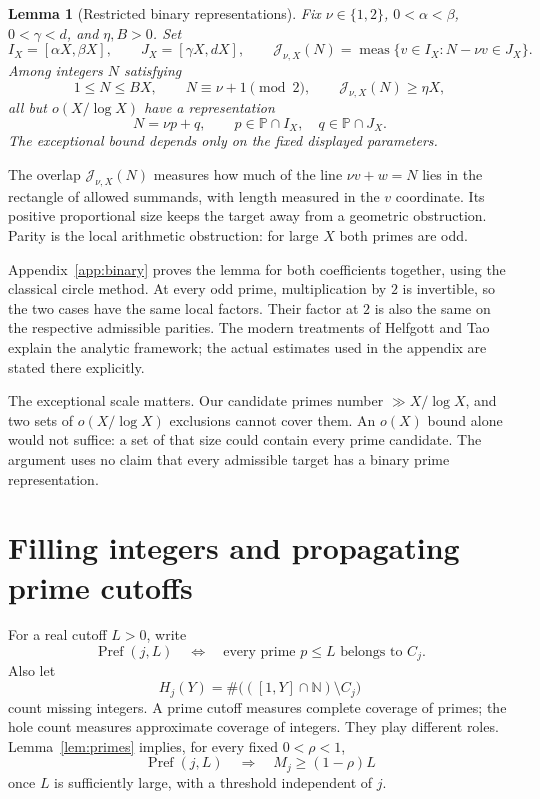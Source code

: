 \documentclass[11pt,letterpaper]{article}
\numberwithin{equation}{section}
\newtheorem{lemma}[theorem]{Lemma}
\theoremstyle{definition}
\theoremstyle{remark}
\DeclareMathOperator{\meas}{meas}
\DeclareMathOperator{\Pref}{Pref}
\newcommand{\N}{\mathbb N}
\newcommand{\Pp}{\mathbb P}
\begin{document}
\begin{lemma}[Restricted binary representations]\label{lem:binary}
Fix $\nu\in\{1,2\}$, $0<\alpha<\beta$, $0<\gamma<d$, and
$\eta,B>0$. Set
\[
 I_X=[\alpha X,\beta X],\qquad J_X=[\gamma X,dX],\qquad
 \mathcal J_{\nu,X}(N)=\meas\{v\in I_X:N-\nu v\in J_X\}.
\]
Among integers $N$ satisfying
\begin{equation}\label{eq:binary-targets}
 1\le N\le BX,\qquad N\equiv\nu+1\pmod2,\qquad
 \mathcal J_{\nu,X}(N)\ge\eta X,
\end{equation}
all but $o(X/\log X)$ have a representation
\begin{equation}\label{eq:binary-representation}
 N=\nu p+q,\qquad p\in\Pp\cap I_X,\quad q\in\Pp\cap J_X.
\end{equation}
The exceptional bound depends only on the fixed displayed parameters.
\end{lemma}

The overlap $\mathcal J_{\nu,X}(N)$ measures how much of the line
$\nu v+w=N$ lies in the rectangle of allowed summands, with length
measured in the $v$ coordinate. Its positive proportional size keeps the
target away from a geometric obstruction. Parity is the local arithmetic
obstruction: for large $X$ both primes are odd.

Appendix~\ref{app:binary} proves the lemma for both coefficients together,
using the classical circle method. At every odd prime, multiplication by
$2$ is invertible, so the two cases have the same local factors. Their
factor at $2$ is also the same on the respective admissible parities.
The modern treatments of Helfgott \cite{Helfgott,HelfgottMinor} and Tao
\cite{Tao} explain the analytic framework; the actual estimates used in
the appendix are stated there explicitly.

The exceptional scale matters. Our candidate primes number
$\gg X/\log X$, and two sets of $o(X/\log X)$ exclusions cannot cover
them. An $o(X)$ bound alone would not suffice: a set of that size could
contain every prime candidate. The argument uses no claim that every
admissible target has a binary prime representation.

\section{Filling integers and propagating prime cutoffs}
\label{sec:filling}

For a real cutoff $L>0$, write
\[
 \Pref(j,L)\quad\Longleftrightarrow\quad
 \text{every prime }p\le L\text{ belongs to }C_j.
\]
Also let
\[
 H_j(Y)=\#\bigl(([1,Y]\cap\N)\setminus C_j\bigr)
\]
count missing integers. A prime cutoff measures complete coverage of primes;
the hole count measures approximate coverage of integers. They play different
roles. Lemma~\ref{lem:primes} implies, for every fixed $0<\rho<1$,
\begin{equation}\label{eq:prefix-max}
 \Pref(j,L)\quad\Longrightarrow\quad M_j\ge(1-\rho)L
\end{equation}
once $L$ is sufficiently large, with a threshold independent of $j$.
\end{document}
